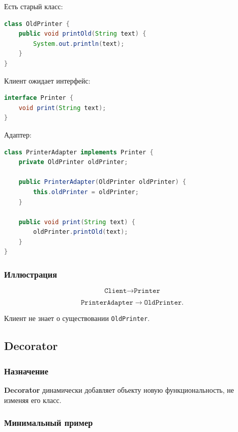 \documentclass[12pt,a4paper]{article}
\begin{document}
Есть старый класс:

\begin{lstlisting}[language=Java]
class OldPrinter {
    public void printOld(String text) {
        System.out.println(text);
    }
}
\end{lstlisting}

Клиент ожидает интерфейс:

\begin{lstlisting}[language=Java]
interface Printer {
    void print(String text);
}
\end{lstlisting}

Адаптер:

\begin{lstlisting}[language=Java,caption={Adapter}]
class PrinterAdapter implements Printer {
    private OldPrinter oldPrinter;

    public PrinterAdapter(OldPrinter oldPrinter) {
        this.oldPrinter = oldPrinter;
    }

    public void print(String text) {
        oldPrinter.printOld(text);
    }
}
\end{lstlisting}

\subsubsection{Иллюстрация}

\[
\texttt{Client} \rightarrow \texttt{Printer}
\]

\[
\texttt{PrinterAdapter} \rightarrow \texttt{OldPrinter}.
\]

Клиент не знает о существовании \texttt{OldPrinter}.

\subsection{Decorator}

\subsubsection{Назначение}

\textbf{Decorator} динамически добавляет объекту новую функциональность, не изменяя его класс.

\subsubsection{Минимальный пример}
\end{document}
